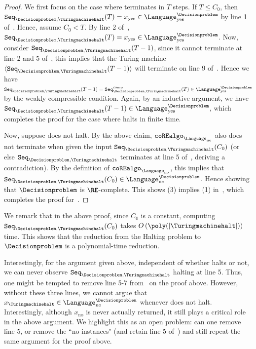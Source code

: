 \begin{proof}
	
	We first focus on the case where \Turingmachinehalt terminates in $T$ steps. If $T \leq C_0$, then $\UniformseqREproof(T) = x_{\text{yes}} \in \Language_{\text{yes}}^\Decisionproblem$ by line 1 of~. Hence, assume $C_0 < T$. By line 2 of~, $\UniformseqREproof(T) = x_{\text{yes}} \in \Language_{\text{yes}}^\Decisionproblem$. Now, consider $\UniformseqREproof(T-1)$, since it cannot terminate at line 2 and 5 of~, this implies that the Turing machine $\langle \UniformseqREproof(T-1) \rangle$ will terminate on line 9 of~. Hence we have $\UniformseqREproof(T-1) = \UniformseqREproof^{\text{comp}}(T) \in \Language_{\text{yes}}^\Decisionproblem$ by the weakly compressible condition. Again, by an inductive argument, we have $\UniformseqREproof(T-1) \in \Language_{\text{yes}}^\Decisionproblem$, which completes the proof for the case where \Turingmachinehalt halts in finite time.
	
	Now, suppose \Turingmachinehalt does not halt. By the above claim, $\coREalgoproof$ also does not terminate when given the input $\UniformseqREproof(C_0)$ (or else $\UniformseqREproof$ terminates at line 5 of~, deriving a contradiction). By the definition of $\coREalgoproof$, this implies that $\UniformseqREproof(C_0) \in \Language_{\text{no}}^\Decisionproblem$. Hence showing that $\Decisionproblem$ is $\RE$-complete. This shows (3) implies (1) in~, which completes the proof for~. 
\end{proof}

We remark that in the above proof, since $C_0$ is a constant, computing $\UniformseqREproof(C_0)$ takes $O\left(\poly(|\text{\Turingmachinehalt}|)\right)$ time. This shows that the reduction from the Halting problem to $\Decisionproblem$ is a polynomial-time reduction. 

Interestingly, for the argument given above, independent of whether \Turingmachinehalt halts or not, we can never observe $\texttt{Seq}_{\Decisionproblem,\text{\Turingmachinehalt}}$ halting at line 5. Thus, one might be tempted to remove line 5-7 from~ on the proof above. However, without these three lines, we cannot argue that $x_{\text{\Turingmachinehalt}} \in \Language_{\text{no}}^\Decisionproblem$ whenever \Turingmachinehalt does not halt. Interestingly, although $x_{\text{no}}$ is never actually returned, it still plays a critical role in the above argument. We highlight this as an open problem: can one remove line 5, or remove the ``no instances" (and retain line 5 of~) and still repeat the same argument for the proof above. 

